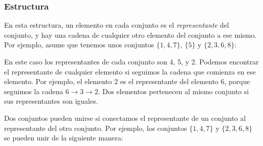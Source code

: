 \subsubsection{Estructura}

En esta estructura, un elemento en cada conjunto
es el \emph{representante} del conjunto, y hay una cadena de cualquier
otro elemento del conjunto a ese mismo. Por ejemplo, asume que tenemos
unos conjuntos $\{1,4,7\}$, $\{5\}$ y $\{2,3,6,8\}$:
\begin{center}
\end{center}

En este caso los representantes de cada conjunto son 4, 5, y 2.
Podemos encontrar el representante de cualquier elemento si seguimos
la cadena que comienza en ese elemento. Por ejemplo, el elemento 2 es
el representante del elemento 6, porque seguimos la cadena
$6 \rightarrow 3 \rightarrow 2$. Dos elementos pertenecen al mismo
conjunto si sus representantes son iguales.

Dos conjuntos pueden unirse si conectamos el representante
de un conjunto al representante del otro conjunto. Por ejemplo,
los conjuntos $\{1,4,7\}$ y $\{2,3,6,8\}$ se pueden unir de la
siguiente manera:
\begin{center}
\end{center}

